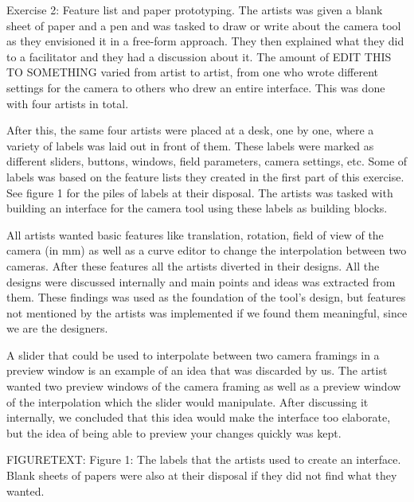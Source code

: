 Exercise 2: Feature list and paper prototyping.
The artists was given a blank sheet of paper and a pen and was tasked to draw or write about the camera tool as they envisioned it in a free-form approach. They then explained what they did to a facilitator and they had a discussion about it. The amount of EDIT THIS TO SOMETHING varied from artist to artist, from one who wrote different settings for the camera to others who drew an entire interface. This was done with four artists in total.

After this, the same four artists were placed at a desk, one by one, where a variety of labels was laid out in front of them. These labels were marked as different sliders, buttons, windows, field parameters, camera settings, etc. Some of  labels was based on the feature lists they created in the first part of this exercise. See figure 1 for the piles of labels at their disposal. The artists was tasked with building an interface for the camera tool using these labels as building blocks.

All artists wanted basic features like translation, rotation, field of view of the camera (in mm) as well as a curve editor to change the interpolation between two cameras. After these features all the artists diverted in their designs. All the designs were discussed internally and main points and ideas was extracted from them. These findings was used as the foundation of the tool's design, but features not mentioned by the artists was implemented if we found them meaningful, since we are the designers.

A slider that could be used to interpolate between two camera framings in a preview window is an example of an idea that was discarded by us. The artist wanted two preview windows of the camera framing as well as a preview window of the interpolation which the slider would manipulate. After discussing it internally, we concluded that this idea would make the interface too elaborate, but the idea of being able to preview your changes quickly was kept.

FIGURETEXT:
Figure 1: The labels that the artists used to create an interface. Blank sheets of papers were also at their disposal if they did not find what they wanted.